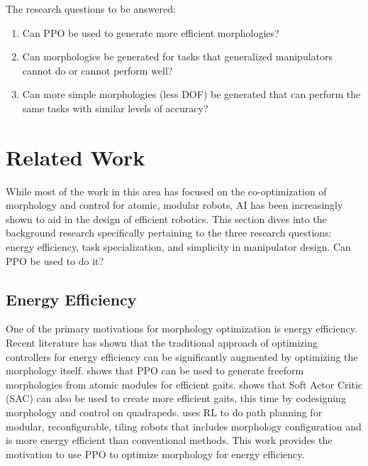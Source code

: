 \documentclass[defaultstyle,11pt]{thesis}
\begin{document}
The research questions to be answered: 
\begin{enumerate}
    \item Can PPO be used to generate more efficient morphologies?
    \item Can morphologies be generated for tasks that generalized manipulators cannot do or cannot perform well?
    \item Can more simple morphologies (less DOF) be generated that can perform the same tasks with similar levels of accuracy?
\end{enumerate}

\section{Related Work}

While most of the work in this area has focused on the co-optimization of morphology and control for atomic, modular robots, AI has been increasingly shown to aid in the design of efficient robotics.
This section dives into the background research specifically pertaining to the three research questions: energy efficiency, task specialization, and simplicity in manipulator design.
Can PPO be used to do it?

\subsection{Energy Efficiency}
One of the primary motivations for morphology optimization is energy efficiency.
Recent literature has shown that the traditional approach of optimizing controllers for energy efficiency can be significantly augmented by optimizing the morphology itself.
\cite{bhatia2023reinforcement} shows that PPO can be used to generate freeform morphologies from atomic modules for efficient gaits.
\cite{luck2019data} shows that Soft Actor Critic (SAC) can also be used to create more efficient gaits, this time by codesigning morphology and control on quadrapeds.
\cite{le2020reinforcement} uses RL to do path planning for modular, reconfigurable, tiling robots that includes morphology configuration and is more energy efficient than conventional methods.
This work provides the motivation to use PPO to optimize morphology for energy efficiency.
\end{document}
